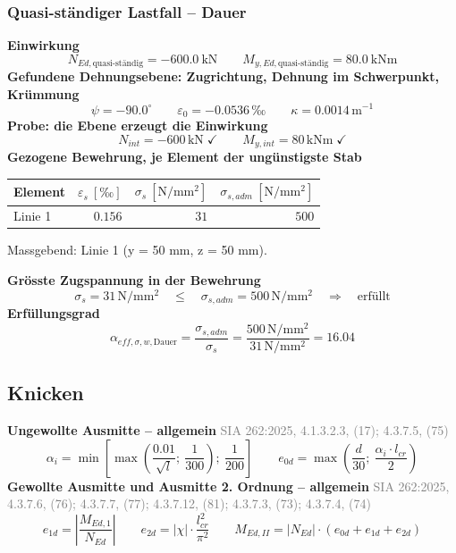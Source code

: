 \documentclass[11pt,a4paper]{article}
\newcommand{\normref}[1]{{\small\textcolor{gray}{#1}}}
\begin{document}
\subsubsection{Quasi-ständiger Lastfall – Dauer}
\noindent\textbf{Einwirkung}
\begin{equation*}
N_{Ed,\text{quasi-ständig}} = -600.0\ \mathrm{kN} \qquad M_{y,Ed,\text{quasi-ständig}} = 80.0\ \mathrm{kNm}
\end{equation*}
\noindent\textbf{Gefundene Dehnungsebene: Zugrichtung, Dehnung im Schwerpunkt, Krümmung}
\begin{equation*}
\psi = -90.0^\circ \qquad \varepsilon_0 = -0.0536\,\text{‰} \qquad \kappa = 0.0014\,\mathrm{m}^{-1}
\end{equation*}
\noindent\textbf{Probe: die Ebene erzeugt die Einwirkung}
\begin{equation*}
N_{int} = -600\,\mathrm{kN} \;\checkmark \qquad M_{y,int} = 80\,\mathrm{kNm} \;\checkmark
\end{equation*}
\noindent\textbf{Gezogene Bewehrung, je Element der ungünstigste Stab}
\begin{longtable}{lrrr}
\hline
Element & $\varepsilon_s\ [‰]$ & $\sigma_s\ [\mathrm{N/mm^2}]$ & $\sigma_{s,adm}\ [\mathrm{N/mm^2}]$ \\
\hline
\endhead
Linie 1 & $0.156$ & $31$ & $500$ \\
\hline
\end{longtable}
Massgebend: Linie 1 (y = 50 mm, z = 50 mm).

\noindent\textbf{Grösste Zugspannung in der Bewehrung}
\begin{equation*}
\sigma_s = 31\,\mathrm{N}/\mathrm{mm}^{2} \quad \le \quad \sigma_{s,adm} = 500\,\mathrm{N}/\mathrm{mm}^{2} \quad \Rightarrow \quad \text{erfüllt}
\end{equation*}
\noindent\textbf{Erfüllungsgrad}
\begin{equation*}
\alpha_{eff,\sigma,w,\text{Dauer}} = \frac{\sigma_{s,adm}}{\sigma_s} = \frac{500\,\mathrm{N}/\mathrm{mm}^{2}}{31\,\mathrm{N}/\mathrm{mm}^{2}} = 16.04
\end{equation*}
\subsection{Knicken}
\noindent\textbf{Ungewollte Ausmitte – allgemein} \hfill \normref{SIA 262:2025, 4.1.3.2.3, (17); 4.3.7.5, (75)}
\begin{equation*}
\alpha_i = \min\left[\max\left(\frac{0.01}{\sqrt{l}};\ \frac{1}{300}\right);\ \frac{1}{200}\right] \qquad e_{0d} = \max\left(\frac{d}{30};\ \frac{\alpha_i \cdot l_{cr}}{2}\right)
\end{equation*}
\noindent\textbf{Gewollte Ausmitte und Ausmitte 2. Ordnung – allgemein} \hfill \normref{SIA 262:2025, 4.3.7.6, (76); 4.3.7.7, (77); 4.3.7.12, (81); 4.3.7.3, (73); 4.3.7.4, (74)}
\begin{equation*}
e_{1d} = \left|\frac{M_{Ed,1}}{N_{Ed}}\right| \qquad e_{2d} = \left|\chi\right| \cdot \frac{l_{cr}^{2}}{\pi^{2}} \qquad M_{Ed,II} = \left|N_{Ed}\right| \cdot \left(e_{0d} + e_{1d} + e_{2d}\right)
\end{equation*}
\end{document}
